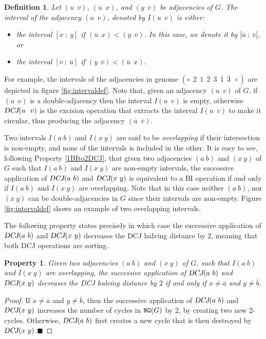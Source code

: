 \documentclass[11pt,final,twoside,nofrench]{thlifl}
\newcommand{\qed}{\ensuremath{\blacksquare}}
\newcommand{\fst}[1]{ \ensuremath{#1} }
\newcommand{\snd}[1]{ \ensuremath{\overline{#1}} }
\newcommand\aff[2]{\ensuremath{(\fst{#1}~\fst{#2})}}
\renewcommand{\NG}{\ensuremath{\mbox{\texttt{NG}}}}
\def\DCJ{\ensuremath{\mbox{\sl DCJ}}}
\newtheorem{property}{Property}
\newtheorem{proof}{Proof}
\newtheorem{definition}{Definition}
\begin{document}
\begin{definition}
Let $(\fst{u}~~\fst{v})$,  $(\snd{u}~~\fst{x})$, and  $(\fst{y}~~\snd{v})$ be adjacencies of $G$. The \emph{interval} of the adjacency  $(\fst{u}~~\fst{v})$, denoted by $I(\fst{u}~~\fst{v})$ is either:
\begin{itemize}
\item the interval $[x~;~y]$ if $(\snd{u}~~\fst{x}) < (\fst{y}~~\snd{v})$.  In this case, we denote it by $]\snd{u}~;~\snd{v}[$, or
\item the interval $[\snd{v}~;~\snd{u}]$ if $(\fst{y}~~\snd{v}) < (\snd{u}~~\fst{x})$.
\end{itemize}
\end{definition}

For example, the intervals of the adjacencies in genome $(\circ~~\fst{2}~~\fst{1}~~\snd{2}~~\fst{3}~~\snd{1}~~\snd{3}~~\circ )$ are depicted in figure \ref{fig:intervaldef}.
Note that, given an adjacency  $(\fst{u}~~\fst{v})$ of $G$,  if  $(\fst{u}~~\fst{v})$ is a double-adjacency then the interval $I(\fst{u}~~\fst{v})$ is empty, otherwise  $\DCJ(\fst{u}~~\fst{v})$ is the excision operation that extracts the interval $I(\fst{u}~~\fst{v})$ to make it circular, thus producing the adjacency $(\snd{u}~~\snd{v})$.

Two intervals  $I\aff{a}{b}$ and $I\aff{x}{y}$ are said to be \emph{overlapping} if
their intersection is non-empty, and none of the intervals is included in the 
other.
It is easy to see, following Property \ref{1BIto2DCJ}, that given two
adjacencies $\aff{a}{b}$ and $\aff{x}{y}$ of $G$ such that
$I\aff{a}{b}$ and $I\aff{x}{y}$ are non-empty intervals, the
successive application of $\DCJ\aff{a}{b}$ and $\DCJ\aff{x}{y}$ is
equivalent  to a BI operation if and only if $I\aff{a}{b}$ and
$I\aff{x}{y}$ are overlapping. Note that in this case neither
$\aff{a}{b}$, nor  $\aff{x}{y}$ can be double-adjacencies in $G$ since
their  intervals are non-empty. Figure \ref{fig:intervaldef} shows an
example of two overlapping intervals. 

The following property states precisely in which case the successive application of $\DCJ\aff{a}{b}$ and $\DCJ\aff{x}{y}$ decreases the DCJ halving distance by $2$, meaning that both DCJ operations are sorting.

\begin{property}
Given two adjacencies $\aff{a}{b}$ and $\aff{x}{y}$ of $G$, such that 
$I\aff{a}{b}$ and $I\aff{x}{y}$ are overlapping, the successive application of $\DCJ\aff{a}{b}$ and $\DCJ\aff{x}{y}$ decreases the DCJ halving distance by $2$ if and only if  $x \neq \snd{a}$ and $y \neq \snd{b}$.

\end{property}
\begin{proof}
If $x \neq \snd{a}$ and $y \neq \snd{b}$, then the successive application of $\DCJ\aff{a}{b}$ and $\DCJ\aff{x}{y}$ increases the number of cycles in $\NG(G)$ by $2$, by creating two new 2-cycles. Otherwise, $\DCJ\aff{a}{b}$ first creates a new cycle that is then destroyed by  $\DCJ\aff{x}{y}$.\qed
\end{proof}
\end{document}
